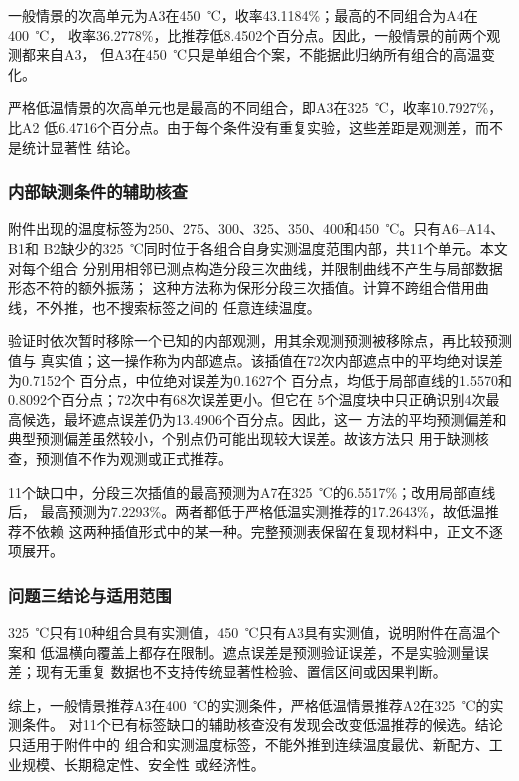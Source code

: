 一般情景的次高单元为A3在450~℃，收率43.1184\%；最高的不同组合为A4在400~℃，
收率36.2778\%，比推荐低8.4502个百分点。因此，一般情景的前两个观测都来自A3，
但A3在450~℃只是单组合个案，不能据此归纳所有组合的高温变化。

严格低温情景的次高单元也是最高的不同组合，即A3在325~℃，收率10.7927\%，比A2
低6.4716个百分点。由于每个条件没有重复实验，这些差距是观测差，而不是统计显著性
结论。

\subsubsection{内部缺测条件的辅助核查}

附件出现的温度标签为250、275、300、325、350、400和450~℃。只有A6--A14、B1和
B2缺少的325~℃同时位于各组合自身实测温度范围内部，共11个单元。本文对每个组合
分别用相邻已测点构造分段三次曲线，并限制曲线不产生与局部数据形态不符的额外振荡；
这种方法称为保形分段三次插值。计算不跨组合借用曲线，不外推，也不搜索标签之间的
任意连续温度。

验证时依次暂时移除一个已知的内部观测，用其余观测预测被移除点，再比较预测值与
真实值；这一操作称为内部遮点。该插值在72次内部遮点中的平均绝对误差为0.7152个
百分点，中位绝对误差为0.1627个
百分点，均低于局部直线的1.5570和0.8092个百分点；72次中有68次误差更小。但它在
5个温度块中只正确识别4次最高候选，最坏遮点误差仍为13.4906个百分点。因此，这一
方法的平均预测偏差和典型预测偏差虽然较小，个别点仍可能出现较大误差。故该方法只
用于缺测核查，预测值不作为观测或正式推荐。

11个缺口中，分段三次插值的最高预测为A7在325~℃的6.5517\%；改用局部直线后，
最高预测为7.2293\%。两者都低于严格低温实测推荐的17.2643\%，故低温推荐不依赖
这两种插值形式中的某一种。完整预测表保留在复现材料中，正文不逐项展开。

\subsubsection{问题三结论与适用范围}

325~℃只有10种组合具有实测值，450~℃只有A3具有实测值，说明附件在高温个案和
低温横向覆盖上都存在限制。遮点误差是预测验证误差，不是实验测量误差；现有无重复
数据也不支持传统显著性检验、置信区间或因果判断。

综上，一般情景推荐A3在400~℃的实测条件，严格低温情景推荐A2在325~℃的实测条件。
对11个已有标签缺口的辅助核查没有发现会改变低温推荐的候选。结论只适用于附件中的
组合和实测温度标签，不能外推到连续温度最优、新配方、工业规模、长期稳定性、安全性
或经济性。
